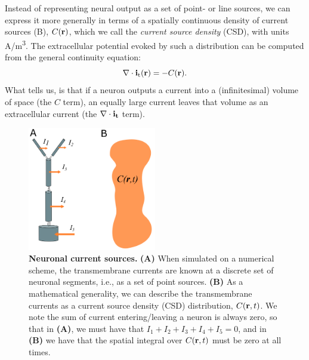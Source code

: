 \section{}
\label{sec:VC:CSD}
Instead of representing neural output as a set of point- or line sources, we can express it more generally in terms of a spatially continuous density of current sources (B), $C({\bf r})$, which we call the \textit{current source density} (CSD), with units \si{A/m^3}. The extracellular potential evoked by such a distribution can be computed from the general continuity equation:
\begin{equation}
\nabla \cdot {\bf i_\mathrm{t}}({\bf r}) = - C({\bf r}).
\label{eq:VC:CSD1}
\end{equation}
What  tells us, is that if a neuron outputs a current into a (infinitesimal) volume of space (the $C$ term), an equally large current leaves that volume as an extracellular current (the $\nabla \cdot {\bf i_t}$ term).

\begin{figure}[!ht]
\begin{center}
\includegraphics[width=0.5\textwidth]{Figures/VC/CSD.png}
\end{center}
\caption{\textbf{Neuronal current sources.}  {\bf (A)} When simulated on a numerical scheme, the transmembrane currents are known at a discrete set of neuronal segments, i.e., as a set of point sources.  {\bf (B)} As a mathematical generality, we can describe the transmembrane currents as a current source density (CSD) distribution, $C({\bf r},t)$. We note the sum of current entering/leaving a neuron is always zero, so that in {\bf (A)}, we must have that $I_1 + I_2 + I_3 + I_4 + I_5= 0$, and in {\bf (B)} we have that the spatial integral over $C({\bf r},t)$ must be zero at all times.
}
\label{fig:VC:CSD}
\end{figure}

